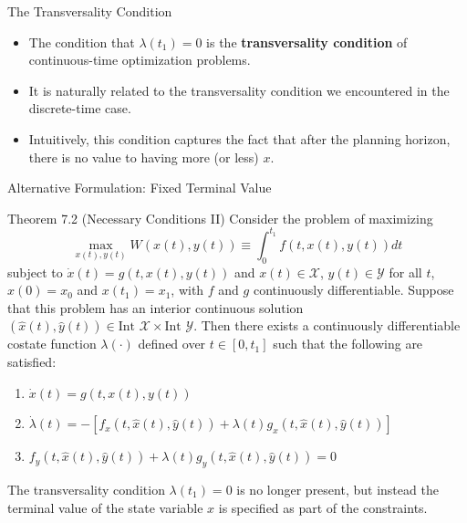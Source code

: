 \documentclass[9pt,aspectratio=169]{beamer}
\newcommand{\X}{\mathcal{X}}
\newcommand{\Y}{\mathcal{Y}}
\begin{document}
\begin{frame}{The Transversality Condition}
\begin{itemize}
    \item The condition that $\lambda(t_1) = 0$ is the \textbf{transversality
      condition} of continuous-time optimization problems.
    \item It is naturally related to the transversality condition we
    encountered in the discrete-time case.
    \item Intuitively, this condition captures the fact that after the
    planning horizon, there is no value to having more (or less) $x$.
\end{itemize}
\end{frame}

\begin{frame}{Alternative Formulation: Fixed Terminal Value}
    \begin{block}{Theorem 7.2 (Necessary Conditions II)}
        Consider the problem of maximizing
        \begin{equation*}
            \max_{x(t),y(t)} W(x(t), y(t)) \equiv \int_0^{t_1} f(t, x(t), y(t))dt
        \end{equation*}
        subject to $\dot{x}(t) = g(t, x(t), y(t))$ and $x(t) \in \X$, $y(t)
        \in \Y$ for all $t$, $x(0) = x_0$ and $x(t_1) = x_1$, with $f$ and
        $g$ continuously differentiable. Suppose that this problem has an
        interior continuous solution $(\hat{x}(t), \hat{y}(t)) \in \text{Int
        } \X \times \text{Int } \Y$. Then there exists a continuously differentiable
        costate function $\lambda(\cdot)$ defined over $t \in [0, t_1]$ such
        that the following are satisfied:
        \begin{enumerate}
            \item $\dot{x}(t) = g(t, x(t), y(t))$
            \item $\dot{\lambda}(t) = -[f_x(t, \hat{x}(t), \hat{y}(t)) +
            \lambda(t)g_x(t, \hat{x}(t), \hat{y}(t))]$
            \item $f_y(t, \hat{x}(t), \hat{y}(t)) + \lambda(t)g_y(t,
            \hat{x}(t), \hat{y}(t)) = 0$
        \end{enumerate}
    \end{block}
    The transversality condition $\lambda(t_1) = 0$ is no longer present, but
    instead the terminal value of the state variable $x$ is specified as part
    of the constraints.
\end{frame}
\end{document}
